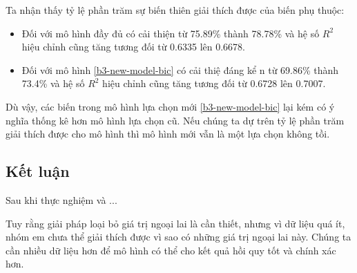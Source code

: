 Ta nhận thấy tỷ lệ phần trăm sự biến thiên giải thích được của biến phụ thuộc:
\begin{itemize}
	\item Đối với mô hình đầy đủ có cải thiện từ 75.89\% thành 78.78\% và hệ số $R^2$ hiệu chỉnh cũng tăng tương đối từ 0.6335 lên 0.6678. 
	\item Đối với mô hình \ref{b3-new-model-bic} có cải thiệ đáng kể n từ 69.86\% thành 73.4\% và hệ số $R^2$ hiệu chỉnh cũng tăng tương đối từ 0.6728 lên 0.7007. 
\end{itemize}

Dù vậy, các biến trong mô hình lựa chọn mới \ref{b3-new-model-bic} lại kém có ý nghĩa thống kê hơn mô hình lựa chọn cũ. Nếu chúng ta dự trên tỷ lệ phần trăm giải thích được cho mô hình thì mô hình mới vẫn là một lựa chọn không tồi.

\subsection*{Kết luận}

Sau khi thực nghiệm và ...

Tuy rằng giải pháp loại bỏ giá trị ngoại lai là cần thiết, nhưng vì dữ liệu quá ít, nhóm em chưa thể giải thích được vì sao có những giá trị ngoại lai này. Chúng ta cần nhiều dữ liệu hơn để mô hình có thể cho kết quả hồi quy tốt và chính xác hơn.